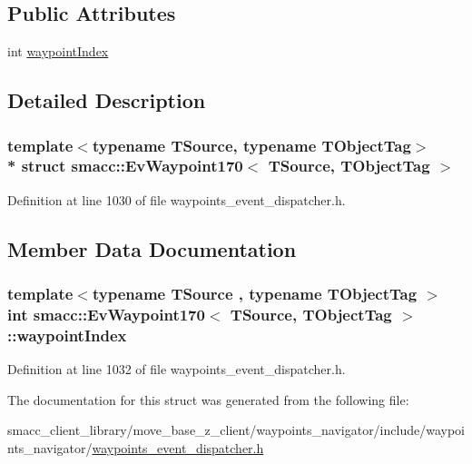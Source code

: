 \subsection*{Public Attributes}
\begin{DoxyCompactItemize}
\item 
int \hyperlink{structsmacc_1_1EvWaypoint170_a71351875f9ce75380e59b319eb830b47}{waypoint\+Index}
\end{DoxyCompactItemize}


\subsection{Detailed Description}
\subsubsection*{template$<$typename T\+Source, typename T\+Object\+Tag$>$\\*
struct smacc\+::\+Ev\+Waypoint170$<$ T\+Source, T\+Object\+Tag $>$}



Definition at line 1030 of file waypoints\+\_\+event\+\_\+dispatcher.\+h.



\subsection{Member Data Documentation}
\subsubsection[{\texorpdfstring{waypoint\+Index}{waypointIndex}}]{\setlength{\rightskip}{0pt plus 5cm}template$<$typename T\+Source , typename T\+Object\+Tag $>$ int {\bf smacc\+::\+Ev\+Waypoint170}$<$ T\+Source, T\+Object\+Tag $>$\+::waypoint\+Index}\hypertarget{structsmacc_1_1EvWaypoint170_a71351875f9ce75380e59b319eb830b47}{}\label{structsmacc_1_1EvWaypoint170_a71351875f9ce75380e59b319eb830b47}


Definition at line 1032 of file waypoints\+\_\+event\+\_\+dispatcher.\+h.



The documentation for this struct was generated from the following file\+:\begin{DoxyCompactItemize}
\item 
smacc\+\_\+client\+\_\+library/move\+\_\+base\+\_\+z\+\_\+client/waypoints\+\_\+navigator/include/waypoints\+\_\+navigator/\hyperlink{waypoints__event__dispatcher_8h}{waypoints\+\_\+event\+\_\+dispatcher.\+h}\end{DoxyCompactItemize}
